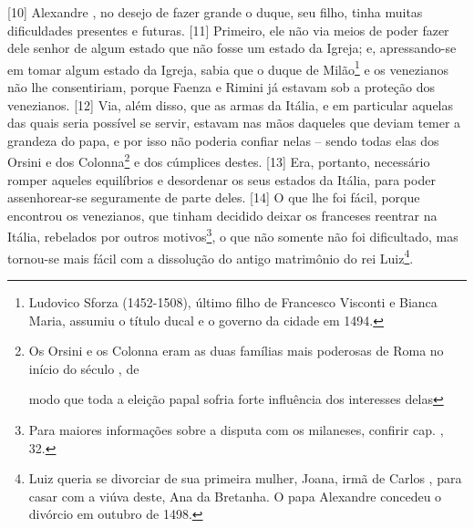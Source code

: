 {[}10{]} Alexandre , no desejo de fazer grande o duque, seu filho,
tinha muitas dificuldades presentes e futuras. {[}11{]} Primeiro, ele
não via meios de poder fazer dele senhor de algum estado que não fosse
um estado da Igreja; e, apressando-se em tomar algum estado da Igreja,
sabia que o duque de Milão\footnote{Ludovico Sforza (1452-1508), último
  filho de Francesco Visconti e Bianca Maria, assumiu o título ducal e o
  governo da cidade em 1494.} e os venezianos não lhe consentiriam,
porque Faenza e Rimini já estavam sob a proteção dos venezianos.
{[}12{]} Via, além disso, que as armas da Itália, e em particular
aquelas das quais seria possível se servir, estavam nas mãos daqueles
que deviam temer a grandeza do papa, e por isso não poderia confiar
nelas -- sendo todas elas dos Orsini e dos Colonna\footnote{Os Orsini e
  os Colonna eram as duas famílias mais poderosas de Roma no início do
  século , de

  modo que toda a eleição papal sofria forte influência dos interesses
  delas} e dos cúmplices destes. {[}13{]} Era, portanto, necessário
romper aqueles equilíbrios e desordenar os seus estados da Itália, para
poder assenhorear-se seguramente de parte deles. {[}14{]} O que lhe foi
fácil, porque encontrou os venezianos, que tinham decidido deixar os
franceses reentrar na Itália, rebelados por outros motivos\footnote{Para
  maiores informações sobre a disputa com os milaneses, confirir cap.
  , 32.}, o que não somente não foi dificultado, mas tornou-se mais
fácil com a dissolução do antigo matrimônio do rei Luiz\footnote{Luiz
  queria se divorciar de sua primeira mulher, Joana, irmã de Carlos
  , para casar com a viúva deste, Ana da Bretanha. O papa Alexandre
   concedeu o divórcio em outubro de 1498.}.

